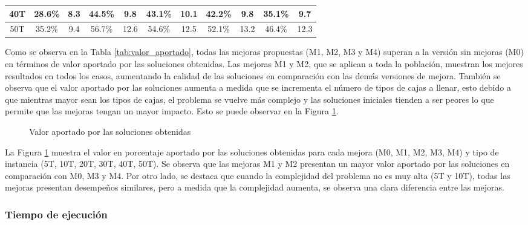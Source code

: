\documentclass[openany]{article}
\begin{document}
\begin{table}[H]
\begin{tabular}{|c|c|c|c|c|c|c|c|c|c|c|}
        40T                                    & 28.6\%                           & 8.3                              & 44.5\%                           & 9.8                              & 43.1\%                           & 10.1        & 42.2\%         & 9.8         & 35.1\%         & 9.7         \\ \hline
        50T                                    & 35.2\%                           & 9.4                              & 56.7\%                           & 12.6                             & 54.6\%                           & 12.5        & 52.1\%         & 13.2        & 46.4\%         & 12.3        \\ \hline
    \end{tabular}
\end{table}

Como se observa en la Tabla \ref{tab:valor_aportado}, todas las mejoras propuestas (M1, M2, M3 y M4) superan a la versión sin mejoras (M0) en términos de valor aportado por las soluciones obtenidas. Las mejoras M1 y M2, que se aplican a toda la población, muestran los mejores resultados en todos los casos, aumentando la calidad de las soluciones en comparación con las demás versiones de mejora. También se observa que el valor aportado por las soluciones aumenta a medida que se incrementa el número de tipos de cajas a llenar, esto debido a que mientras mayor sean los tipos de cajas, el problema se vuelve más complejo y las soluciones iniciales tienden a ser peores lo que permite que las mejoras tengan un mayor impacto. Esto se puede observar en la Figura \ref{fig:valores}.

\begin{figure}[H]
    \centering
    
    \caption{Valor aportado por las soluciones obtenidas}
    \label{fig:valores}
\end{figure}


La Figura \ref{fig:valores} muestra el valor en porcentaje aportado por las soluciones obtenidas para cada mejora (M0, M1, M2, M3, M4) y tipo de instancia (5T, 10T, 20T, 30T, 40T, 50T). Se observa que las mejoras M1 y M2 presentan un mayor valor aportado por las soluciones en comparación con M0, M3 y M4. Por otro lado, se destaca que cuando la complejidad del problema no es muy alta (5T y 10T), todas las mejoras presentan desempeños similares, pero a medida que la complejidad aumenta, se observa una clara diferencia entre las mejoras.


\subsubsection{Tiempo de ejecución}
\end{document}
